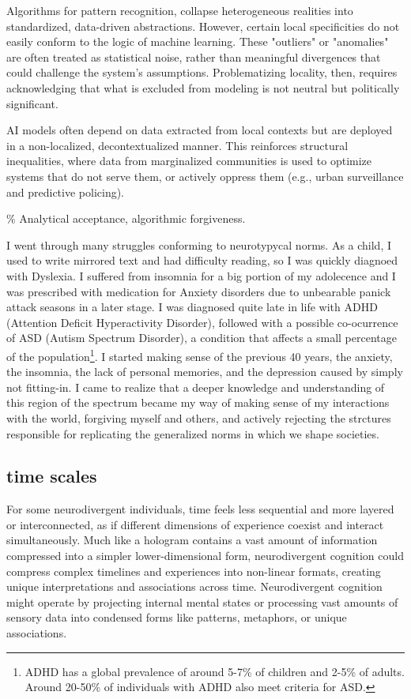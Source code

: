 Algorithms for pattern recognition, collapse heterogeneous realities into standardized, data-driven abstractions. However, certain local specificities do not easily conform to the logic of machine learning. These "outliers" or "anomalies" are often treated as statistical noise, rather than meaningful divergences that could challenge the system's assumptions. Problematizing locality, then, requires acknowledging that what is excluded from modeling is not neutral but politically significant.

AI models often depend on data extracted from local contexts but are deployed in a non-localized, decontextualized manner. This reinforces structural inequalities, where data from marginalized communities is used to optimize systems that do not serve them, or actively oppress them (e.g., urban surveillance and predictive policing).

{\scriptsize \textcolor{comment}{\% Analytical acceptance, algorithmic forgiveness. }}

I went through many struggles conforming to neurotypycal norms. As a child, I used to write mirrored text and had difficulty reading, so I was quickly diagnoed with Dyslexia. I suffered from insomnia for a big portion of my adolecence and I was prescribed with medication for Anxiety disorders due to unbearable panick attack seasons in a later stage. I was diagnosed quite late in life with ADHD (Attention Deficit Hyperactivity Disorder), followed with a possible co-ocurrence of ASD (Autism Spectrum Disorder), a condition that affects a small percentage of the population\footnote{ADHD has a global prevalence of around 5-7\% of children and 2-5\% of adults. Around 20-50\% of individuals with ADHD also meet criteria for ASD.}. I started making sense of the previous 40 years, the anxiety, the insomnia, the lack of personal memories, and the depression caused by simply not fitting-in. I came to realize that a deeper knowledge and understanding of this region of the spectrum became my way of making sense of my interactions with the world, forgiving myself and others, and actively rejecting the strctures responsible for replicating the generalized norms in which we shape societies. 

\subsection*{time scales}

For some neurodivergent individuals, time feels less sequential and more layered or interconnected, as if different dimensions of experience coexist and interact simultaneously. Much like a hologram contains a vast amount of information compressed into a simpler lower-dimensional form, neurodivergent cognition could compress complex timelines and experiences into non-linear formats, creating unique interpretations and associations across time.
Neurodivergent cognition might operate by projecting internal mental states or processing vast amounts of sensory data into condensed forms like patterns, metaphors, or unique associations. 

